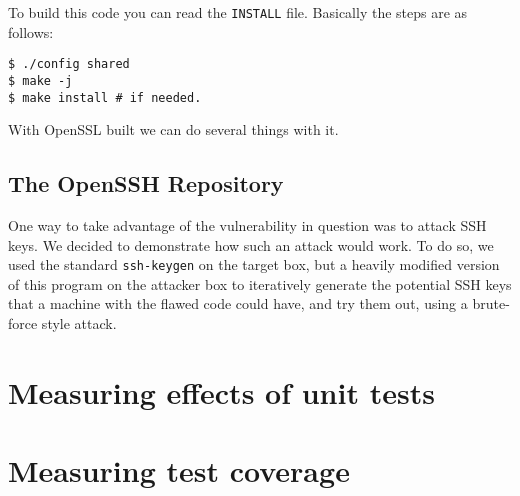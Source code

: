 \documentclass[conference]{IEEEtran}
\begin{document}
To build this code you can read the \verb|INSTALL| file. Basically the
steps are as follows:

\begin{verbatim}
$ ./config shared
$ make -j
$ make install # if needed.
\end{verbatim}

With OpenSSL built we can do several things with it.

\subsection{The OpenSSH Repository}
One way to take advantage of the vulnerability in question was to
attack SSH keys. We decided to demonstrate how such an attack would
work. To do so, we used the standard \verb|ssh-keygen| on the target
box, but a heavily modified version of this program on the attacker
box to iteratively generate the potential SSH keys that a machine with
the flawed code could have, and try them out, using a brute-force
style attack.



\section{Measuring effects of unit tests}
\section{Measuring test coverage}
\end{document}
